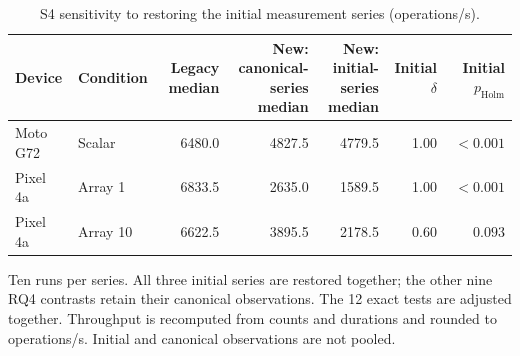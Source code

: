\begin{table}[!t]
\centering
\caption{S4 sensitivity to restoring the initial measurement series (operations/s).}
\label{tab:sensitivity}
\small\setlength{\tabcolsep}{5pt}
\begin{tabular}{llrrrrr}
\toprule
Device & Condition & Legacy median & \shortstack{New: canonical-\\series median} & \shortstack{New: initial-\\series median} & Initial $\delta$ & Initial $p_{\mathrm{Holm}}$ \\
\midrule
Moto G72 & Scalar & 6480.0 & 4827.5 & 4779.5 & 1.00 & $<0.001$ \\
Pixel 4a & Array 1 & 6833.5 & 2635.0 & 1589.5 & 1.00 & $<0.001$ \\
Pixel 4a & Array 10 & 6622.5 & 3895.5 & 2178.5 & 0.60 & $0.093$ \\
\bottomrule
\end{tabular}
\par\smallskip
\begin{minipage}{0.98\textwidth}\footnotesize
Ten runs per series. All three initial series are restored together; the other nine RQ4 contrasts retain their canonical observations. The 12 exact tests are adjusted together. Throughput is recomputed from counts and durations and rounded to operations/s. Initial and canonical observations are not pooled.
\end{minipage}
\end{table}
